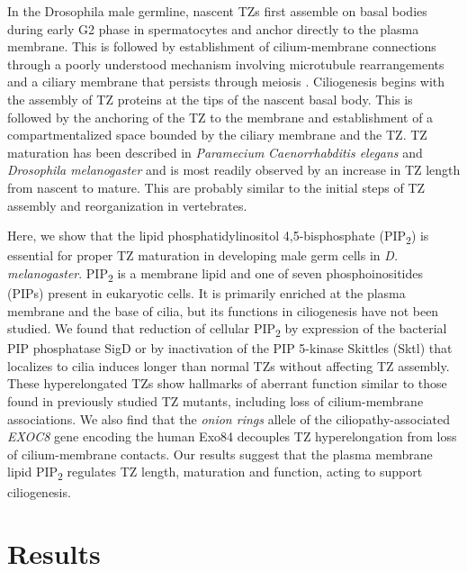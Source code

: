 \documentclass[12pt, twoside, letterpaper]{article}
\newcommand{\PIP}{PIP\textsubscript{2}}
\begin{document}
In the Drosophila male germline, nascent TZs first assemble on basal bodies
during early G2 phase in spermatocytes and anchor directly to the plasma membrane.
This is followed by establishment of cilium-membrane connections
through a poorly understood mechanism
involving microtubule rearrangements \citep{gottardo2013cilium} and a
ciliary membrane that persists through meiosis \citep{riparbelli2012assembly}.
Ciliogenesis begins with the assembly of TZ proteins at the tips of
the nascent basal body.
This is followed by the anchoring of the TZ to the membrane and
establishment of a compartmentalized space bounded by the ciliary membrane
and the TZ.
TZ maturation has been described in
\textit{Paramecium} \citep{aubusson2015transition}
\textit{Caenorrhabditis elegans} \citep{serwas2017centrioles} and
\textit{Drosophila melanogaster} \citep{gottardo2013cilium}
and is most readily observed by an increase in TZ length from nascent to mature.
This are probably similar to the initial steps of TZ assembly and reorganization
in vertebrates.

Here, we show that the lipid phosphatidylinositol 4,5-bisphosphate (\PIP{})
is essential for proper TZ maturation in developing male germ cells in \textit{D. melanogaster}.
\PIP{} is a membrane lipid and one of seven phosphoinositides (PIPs)
present in eukaryotic cells.
It is primarily enriched at the plasma membrane and the base of cilia,
but its functions in ciliogenesis have not been studied.
We found that reduction of cellular \PIP{}
by expression of the bacterial PIP phosphatase SigD
or by inactivation of the PIP 5-kinase Skittles (Sktl) that localizes to cilia
induces longer than normal TZs without affecting TZ assembly.
These hyperelongated TZs show hallmarks of aberrant function similar to those
found in previously studied TZ mutants,
including loss of cilium-membrane associations.
We also find that the \textit{onion rings} allele of the
ciliopathy-associated \textit{EXOC8} gene encoding the human Exo84
decouples TZ hyperelongation from loss of cilium-membrane contacts.
Our results suggest that the plasma membrane lipid \PIP{} regulates TZ length,
maturation and function, acting to support ciliogenesis.


\section{Results}
\end{document}
